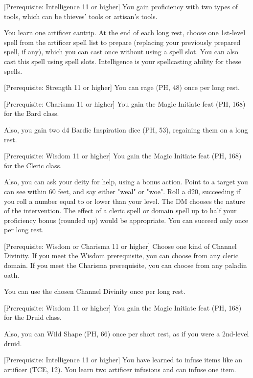 \documentclass[letterpaper,twocolumn,openany,nodeprecatedcode,bg=print]{dndbook}
\begin{document}
[Prerequisite: Intelligence 11 or higher]
\label{artificer-initiate}
You gain proficiency with two types of tools, which can be thieves' tools or artisan's tools.

You learn one artificer cantrip. 
At the end of each long rest, choose one 1st-level spell from the artificer spell list to prepare (replacing your previously prepared spell, if any), which you can cast once without using a spell slot. 
You can also cast this spell using spell slots. 
Intelligence is your spellcasting ability for these spells.

[Prerequisite: Strength 11 or higher]
\label{barbarian-initiate}
You can rage (PH, 48) once per long rest.

[Prerequisite: Charisma 11 or higher]
\label{bard-initiate}
You gain the Magic Initiate feat (PH, 168) for the Bard class.

Also, you gain two d4 Bardic Inspiration dice (PH, 53), regaining them on a long rest.

[Prerequisite: Wisdom 11 or higher]
\label{cleric-initiate}
You gain the Magic Initiate feat (PH, 168) for the Cleric class.

Also, you can ask your deity for help, using a bonus action. 
Point to a target you can see within 60 feet, and say either "weal" or "woe". 
Roll a d20, succeeding if you roll a number equal to or lower than your level.
The DM chooses the nature of the intervention.
The effect of a cleric spell or domain spell up to half your proficiency bonus (rounded up) would be appropriate. 
You can succeed only once per long rest.

[Prerequisite: Wisdom or Charisma 11 or higher]
\label{divine-initiate}
Choose one kind of Channel Divinity. 
If you meet the Wisdom prerequisite, you can choose from any cleric domain. 
If you meet the Charisma prerequisite, you can choose from any paladin oath. 

You can use the chosen Channel Divinity once per long rest.

[Prerequisite: Wisdom 11 or higher]
\label{druid-initiate}
You gain the Magic Initiate feat (PH, 168) for the Druid class.

Also, you can Wild Shape (PH, 66) once per short rest, as if you were a 2nd-level druid.

[Prerequisite: Intelligence 11 or higher]
\label{infuser-initiate}
You have learned to infuse items like an artificer (TCE, 12). 
You learn two artificer infusions and can infuse one item.
\end{document}
